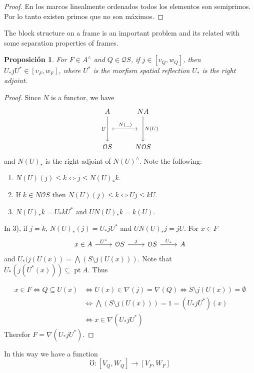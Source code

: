 \documentclass[11pt]{amsart}
\DeclareMathOperator{\pt}{pt}
\theoremstyle{plain}
\newtheorem{prop}[thm]{Proposición}
\theoremstyle{definition}
\begin{document}
\begin{proof}
    En los marcos linealmente ordenados todos los elementos son semiprimos. Por lo tanto existen primos que no son máximos.
\end{proof}

The block structure on a frame is an important problem and its related with some separation properties of frames.
\begin{prop}\label{morfismo}
For $F\in A^\wedge$ and $Q\in\mathcal{Q}S$, if $j\in [v_Q, w_Q]$, then $U_*jU^*\in [v_F, w_F]$, where $U^*$ is the morfism spatial reflection $U_*$ is the right adjoint.
\end{prop}

\begin{proof}
Since $N$ is a functor, we have 
\[\begin{tikzcd}
	A & NA \\
	\\
	{\mathcal{O}S} & {N\mathcal{O}S}
	\arrow[""{name=0, anchor=center, inner sep=0}, "U"', from=1-1, to=3-1]
	\arrow[""{name=1, anchor=center, inner sep=0}, "{N(U)}", from=1-2, to=3-2]
	\arrow["{N(\_)}", shorten <=7pt, shorten >=7pt, maps to, from=0, to=1]
\end{tikzcd}\]
and $N(U)_*$ is the right adjoint of $N(U)^\wedge$. Note the following:
\begin{enumerate}
	\item $N(U)(j)\leq k\Leftrightarrow j\leq N(U)_*k$.
	\item If $k\in N\mathcal{O}S$ then $N(U)(j)\leq k\Leftrightarrow Uj\leq kU$.
	\item $N(U)_*k=U_*kU^*$ and $UN(U)_*k=k(U)$.
\end{enumerate}
In 3), if $j=k$, $N(U)_*(j)=U_*jU^*$ and $UN(U)_*j=jU$. For $x\in F$
\[\begin{tikzcd}
	x\in A & {\mathcal{O}S} & {\mathcal{O}S} & A
	\arrow["{U^*}", from=1-1, to=1-2]
	\arrow["j", from=1-2, to=1-3]
	\arrow["{U_*}", from=1-3, to=1-4]
\end{tikzcd}\]
and $U_*(j(U(x))=\bigwedge(S\setminus j(U(x)))$. Note that $U_*(j(U^*(x)))\subseteq \pt A$. Thus

\[
\begin{split}
x\in F \Leftrightarrow Q\subseteq U(x) &\Leftrightarrow U(x)\in \nabla(j)=\nabla(Q)\Leftrightarrow S\setminus j(U(x))=\emptyset\\
& \Leftrightarrow \bigwedge (S\setminus j(U(x)))=1=(U_*jU^*)(x)\\
&\Leftrightarrow x\in \nabla(U_*jU^*)
\end{split}
\]
Therefor $F=\nabla(U_*jU^*)$.
\end{proof}
In this way we have a function 
\[
\mho\colon [V_Q, W_Q]\to [V_F, W_F]
\]
\end{document}
